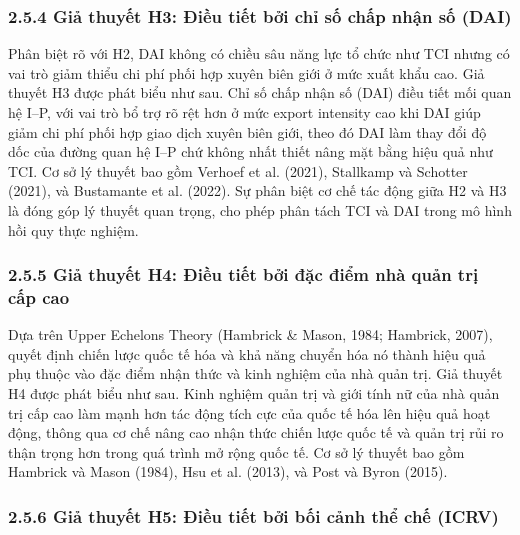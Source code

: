 \documentclass[12pt,a4paper]{article}
\begin{document}
\hypertarget{254-giux1ea3-thuyux1ebft-h3-ux111iux1ec1u-tiux1ebft-bux1edfi-chux1ec9-sux1ed1-chux1ea5p-nhux1eadn-sux1ed1-dai}{%
\subsubsection{2.5.4 Giả thuyết H3: Điều tiết bởi chỉ số chấp nhận số
(DAI)}\label{254-giux1ea3-thuyux1ebft-h3-ux111iux1ec1u-tiux1ebft-bux1edfi-chux1ec9-sux1ed1-chux1ea5p-nhux1eadn-sux1ed1-dai}}

Phân biệt rõ với H2, DAI không có chiều sâu năng lực tổ chức như TCI
nhưng có vai trò giảm thiểu chi phí phối hợp xuyên biên giới ở mức xuất
khẩu cao. Giả thuyết H3 được phát biểu như sau. Chỉ số chấp nhận số
(DAI) điều tiết mối quan hệ I--P, với vai trò bổ trợ rõ rệt hơn ở mức
export intensity cao khi DAI giúp giảm chi phí phối hợp giao dịch xuyên
biên giới, theo đó DAI làm thay đổi độ dốc của đường quan hệ I--P chứ
không nhất thiết nâng mặt bằng hiệu quả như TCI. Cơ sở lý thuyết bao gồm
Verhoef et al. (2021), Stallkamp và Schotter (2021), và Bustamante et
al. (2022). Sự phân biệt cơ chế tác động giữa H2 và H3 là đóng góp lý
thuyết quan trọng, cho phép phân tách TCI và DAI trong mô hình hồi quy
thực nghiệm.

\hypertarget{255-giux1ea3-thuyux1ebft-h4-ux111iux1ec1u-tiux1ebft-bux1edfi-ux111ux1eb7c-ux111iux1ec3m-nhuxe0-quux1ea3n-trux1ecb-cux1ea5p-cao}{%
\subsubsection{2.5.5 Giả thuyết H4: Điều tiết bởi đặc điểm nhà quản trị
cấp
cao}\label{255-giux1ea3-thuyux1ebft-h4-ux111iux1ec1u-tiux1ebft-bux1edfi-ux111ux1eb7c-ux111iux1ec3m-nhuxe0-quux1ea3n-trux1ecb-cux1ea5p-cao}}

Dựa trên Upper Echelons Theory (Hambrick \& Mason, 1984; Hambrick,
2007), quyết định chiến lược quốc tế hóa và khả năng chuyển hóa nó thành
hiệu quả phụ thuộc vào đặc điểm nhận thức và kinh nghiệm của nhà quản
trị. Giả thuyết H4 được phát biểu như sau. Kinh nghiệm quản trị và giới
tính nữ của nhà quản trị cấp cao làm mạnh hơn tác động tích cực của quốc
tế hóa lên hiệu quả hoạt động, thông qua cơ chế nâng cao nhận thức chiến
lược quốc tế và quản trị rủi ro thận trọng hơn trong quá trình mở rộng
quốc tế. Cơ sở lý thuyết bao gồm Hambrick và Mason (1984), Hsu et al.
(2013), và Post và Byron (2015).

\hypertarget{256-giux1ea3-thuyux1ebft-h5-ux111iux1ec1u-tiux1ebft-bux1edfi-bux1ed1i-cux1ea3nh-thux1ec3-chux1ebf-icrv}{%
\subsubsection{2.5.6 Giả thuyết H5: Điều tiết bởi bối cảnh thể chế
(ICRV)}\label{256-giux1ea3-thuyux1ebft-h5-ux111iux1ec1u-tiux1ebft-bux1edfi-bux1ed1i-cux1ea3nh-thux1ec3-chux1ebf-icrv}}
\end{document}
